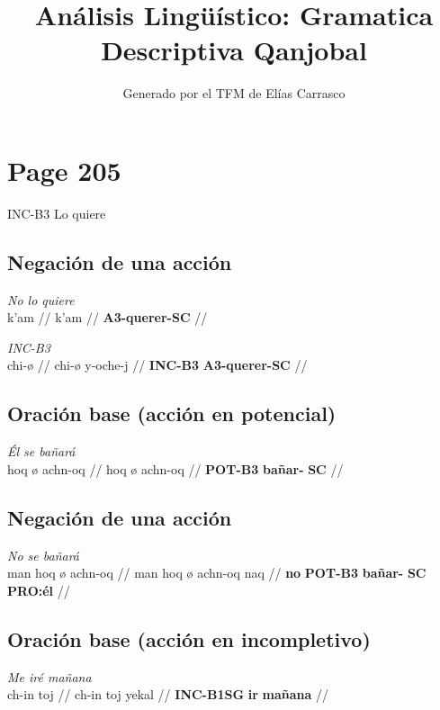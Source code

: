\documentclass{article}%
\title{Análisis Lingüístico: Gramatica Descriptiva Qanjobal}%
\author{Generado por el TFM de Elías Carrasco}%
\begin{document}
%
\normalsize%
\maketitle%
\section{Page 205}%
\label{sec:Page205}%
INC{-}B3 %
Lo quiere %
\subsection{Negación de una acción}%
\label{subsec:Negacindeunaaccin}%

%
\par\medskip%
\ex
\textit{No lo quiere} \\
\begingl
\gla k'am //
\glb k'am //
\glc \textbf{A3-querer-SC} //
\endgl
\xe
%
\medskip%
\par\medskip%
\ex
\textit{INC-B3} \\
\begingl
\gla chi-ø //
\glb chi-ø y-oche-j //
\glc \textbf{INC-}\textbf{B3} \textbf{A3-querer-SC} //
\endgl
\xe
%
\medskip%
\subsection{Oración base (acción en potencial)}%
\label{subsec:Oracinbase(accinenpotencial)}%

%
\par\medskip%
\ex
\textit{Él se bañará} \\
\begingl
\gla hoq ø achn-oq //
\glb hoq ø achn-oq //
\glc \textbf{POT-B3} \textbf{bañar-} \textbf{SC} //
\endgl
\xe
%
\medskip%
\subsection{Negación de una acción}%
\label{subsec:Negacindeunaaccin}%

%
\par\medskip%
\ex
\textit{No se bañará} \\
\begingl
\gla man hoq ø achn-oq //
\glb man hoq ø achn-oq naq //
\glc \textbf{no} \textbf{POT-B3} \textbf{bañar-} \textbf{SC} \textbf{PRO:él} //
\endgl
\xe
%
\medskip%
\subsection{Oración base (acción en incompletivo)}%
\label{subsec:Oracinbase(accinenincompletivo)}%

%
\par\medskip%
\ex
\textit{Me iré mañana} \\
\begingl
\gla ch-in toj //
\glb ch-in toj yekal //
\glc \textbf{INC-B1SG} \textbf{ir} \textbf{mañana} //
\endgl
\xe
%
\medskip%
\end{document}

